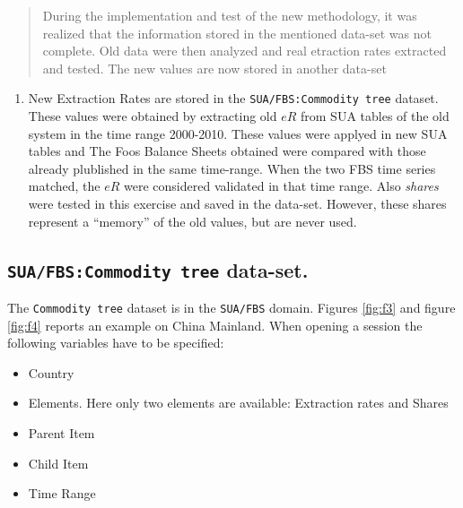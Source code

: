\documentclass[]{article}
\providecommand{\tightlist}{%
  \setlength{\itemsep}{0pt}\setlength{\parskip}{0pt}}
\begin{document}
\begin{quote}
During the implementation and test of the new methodology, it was
realized that the information stored in the mentioned data-set was not
complete. Old data were then analyzed and real etraction rates extracted
and tested. The new values are now stored in another data-set
\end{quote}

\begin{enumerate}
\def\labelenumi{\arabic{enumi}.}
\setcounter{enumi}{2}
\tightlist
\item
  New Extraction Rates are stored in the
  \texttt{SUA/FBS:Commodity\ tree} dataset. These values were obtained
  by extracting old \(eR\) from SUA tables of the old system in the time
  range 2000-2010. These values were applyed in new SUA tables and The
  Foos Balance Sheets obtained were compared with those already
  plublished in the same time-range. When the two FBS time series
  matched, the \(eR\) were considered validated in that time range. Also
  \emph{shares} were tested in this exercise and saved in the data-set.
  However, these shares represent a ``memory'' of the old values, but
  are never used.
\end{enumerate}

\subsection{\texorpdfstring{\texttt{SUA/FBS:Commodity\ tree}
data-set.}{SUA/FBS:Commodity tree data-set.}}\label{suafbscommodity-tree-data-set.}

The \texttt{Commodity\ tree} dataset is in the \texttt{SUA/FBS} domain.
Figures \ref{fig:f3} and figure \ref{fig:f4} reports an example on China
Mainland. When opening a session the following variables have to be
specified:

\begin{itemize}
\tightlist
\item
  Country
\item
  Elements. Here only two elements are available: Extraction rates and
  Shares
\item
  Parent Item
\item
  Child Item
\item
  Time Range
\end{itemize}
\end{document}
